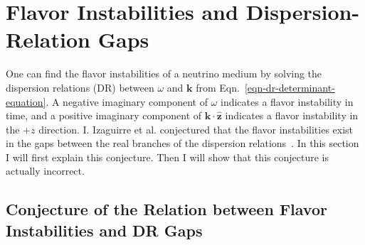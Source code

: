 





\section{\label{chap:collective-sec:fast-mode-subsec:instabilities-and-gaps}Flavor Instabilities and Dispersion-Relation Gaps}

One can find the flavor instabilities of a neutrino medium by solving the dispersion relations (DR) between $\omega$ and $\mathbf k$ from Eqn.~\eqref{eqn-dr-determinant-equation}. A negative imaginary component of $\omega$ indicates a flavor instability in time, and a positive imaginary component of $\mathbf k \cdot \hat{\mathbf z}$ indicates a flavor instability in the $+z$ direction. I. Izaguirre et al. conjectured that the flavor instabilities exist in the gaps between the real branches of the dispersion relations~\cite{Izaguirre2016a}. In this section I will first explain this conjecture. Then I will show that this conjecture is actually incorrect.


\subsection{Conjecture of the Relation between Flavor Instabilities and DR Gaps}

